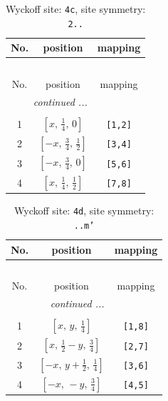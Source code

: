 \documentclass[fleqn,8pt]{jsarticle}
\begin{document}
\renewcommand{\arraystretch}{1.2}
\begin{longtable}{ccc}
\caption{Wyckoff site: {\tt 4c}, site symmetry: {\tt 2..}}
 \\
 \hline \hline
No. & position & mapping \\ \hline \endfirsthead

\multicolumn{2}{l}{\tablename\ \thetable{}} \\
 \hline \hline
No. & position & mapping \\ \hline \endhead

 \hline \hline
\multicolumn{2}{r}{\footnotesize\it continued ...} \\ \endfoot

 \hline \hline
\multicolumn{2}{r}{} \\ \endlastfoot

1 & $\left[ x,\, \frac{1}{4},\, 0 \right]$ & {\tt [1,2]} \\ \hline
2 & $\left[ - x,\, \frac{3}{4},\, \frac{1}{2} \right]$ & {\tt [3,4]} \\ \hline
3 & $\left[ - x,\, \frac{3}{4},\, 0 \right]$ & {\tt [5,6]} \\ \hline
4 & $\left[ x,\, \frac{1}{4},\, \frac{1}{2} \right]$ & {\tt [7,8]} \\
\end{longtable}
\renewcommand{\arraystretch}{1.2}
\begin{longtable}{ccc}
\caption{Wyckoff site: {\tt 4d}, site symmetry: {\tt ..m'}}
 \\
 \hline \hline
No. & position & mapping \\ \hline \endfirsthead

\multicolumn{2}{l}{\tablename\ \thetable{}} \\
 \hline \hline
No. & position & mapping \\ \hline \endhead

 \hline \hline
\multicolumn{2}{r}{\footnotesize\it continued ...} \\ \endfoot

 \hline \hline
\multicolumn{2}{r}{} \\ \endlastfoot

1 & $\left[ x,\, y,\, \frac{1}{4} \right]$ & {\tt [1,8]} \\ \hline
2 & $\left[ x,\, \frac{1}{2} - y,\, \frac{3}{4} \right]$ & {\tt [2,7]} \\ \hline
3 & $\left[ - x,\, y + \frac{1}{2},\, \frac{1}{4} \right]$ & {\tt [3,6]} \\ \hline
4 & $\left[ - x,\, - y,\, \frac{3}{4} \right]$ & {\tt [4,5]} \\
\end{longtable}
\end{document}
